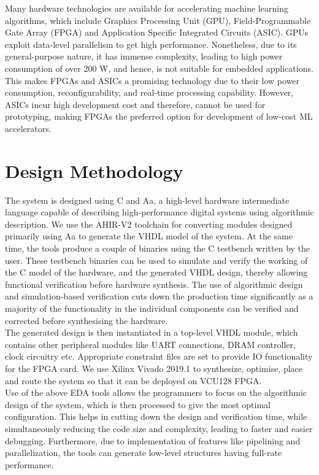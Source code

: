 \documentclass[a4paper,12pt, final]{report}
\begin{document}
Many hardware technologies are available for accelerating machine learning algorithms, which include Graphics Processing Unit (GPU), Field-Programmable Gate Array (FPGA) and Application Specific Integrated Circuits (ASIC). GPUs exploit data-level parallelism to get high performance. Nonetheless, due to its general-purpose nature, it has immense complexity, leading to high power consumption of over 200 W, and hence, is not suitable for embedded applications.
\\

This makes FPGAs and ASICs a promising technology due to their low power consumption, reconfigurability, and real-time processing capability. However, ASICs incur high development cost and therefore, cannot be used for prototyping, making FPGAs the preferred option for development of low-cost ML accelerators.


\section{Design Methodology}

The system is designed using C and Aa, a high-level hardware intermediate language \cite{inproceedings} capable of describing high-performance digital systems using algorithmic description. We use the AHIR-V2 toolchain \cite{ahir} for converting modules designed primarily using Aa to generate the VHDL model of the system. At the same time, the tools produce a couple of binaries using the C testbench written by the user. These testbench binaries can be used to simulate and verify the working of the C model of the hardware, and the generated VHDL design, thereby allowing functional verification before hardware synthesis. The use of algorithmic design and simulation-based verification cuts down the production time significantly as a majority of the functionality in the individual components can be verified and corrected before synthesising the hardware.
\\

The generated design is then instantiated in a top-level VHDL module, which contains other peripheral modules like UART connections, DRAM controller, clock circuitry etc. Appropriate constraint files are set to provide IO functionality for the FPGA card. We use Xilinx Vivado 2019.1 to synthesize, optimise, place and route the system so that it can be deployed on VCU128 FPGA.
\\

Use of the above EDA tools allows the programmers to focus on the algorithmic design of the system, which is then processed to give the most optimal configuration. This helps in cutting down the design and verification time, while simultaneously reducing the code size and complexity, leading to faster and easier debugging. Furthermore, due to implementation of features like pipelining and parallelization, the tools can generate low-level structures having full-rate performance.
\end{document}
